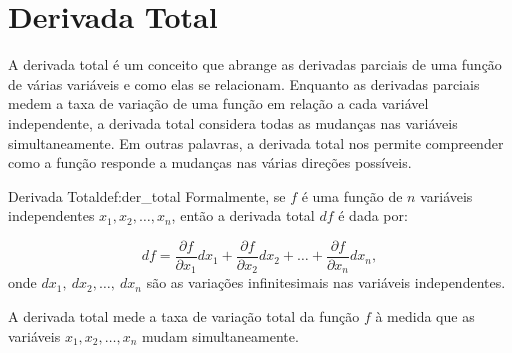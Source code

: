 
\section{Derivada Total}

A derivada total é um conceito que abrange as derivadas parciais de uma função de várias variáveis e como elas se relacionam. Enquanto as derivadas parciais medem a taxa de variação de uma função em relação a cada variável independente, a derivada total considera todas as mudanças nas variáveis simultaneamente. Em outras palavras, a derivada total nos permite compreender como a função responde a mudanças nas várias direções possíveis. 


\begin{definition}{Derivada Total}{def:der_total}
Formalmente, se \(f\) é uma função de \(n\) variáveis independentes \(x_1, x_2, \ldots, x_n\), então a derivada total \(df\) é dada por:

\[df = \frac{\partial f}{\partial x_1} dx_1 + \frac{\partial f}{\partial x_2} dx_2 + \ldots + \frac{\partial f}{\partial x_n} dx_n,\]
onde \(dx_1,~dx_2,\ldots,~dx_n\) são as variações infinitesimais nas variáveis independentes.
\end{definition}


A derivada total mede a taxa de variação total da função \(f\) à medida que as variáveis \(x_1, x_2, \ldots, x_n\) mudam simultaneamente.






\newpage
